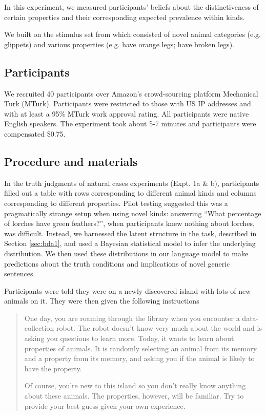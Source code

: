 \documentclass[10pt,letterpaper]{article}
\begin{document}
In this experiment, we measured participants' beliefs about the distinctiveness of certain properties and their corresponding expected prevalence within kinds.

We built on the stimulus set from  which consisted of novel animal categories (e.g. glippets) and various properties (e.g. have orange legs; have broken legs).


\subsection{Participants}

We recruited 40 participants over Amazon's crowd-sourcing platform Mechanical Turk (MTurk).  
Participants were restricted to those with US IP addresses and with at least a 95\% MTurk work approval rating. 
All participants were native English speakers. 
The experiment took about 5-7 minutes and participants were compensated \$0.75.

\subsection{Procedure and materials}

In the truth judgments of natural cases experiments (Expt. 1a \& b), participants filled out a table with rows corresponding to different animal kinds and columns corresponding to different properties. 
Pilot testing suggested this was a pragmatically strange setup when using novel kinds: answering ``What percentage of lorches have green feathers?'', when participants knew nothing about lorches, was difficult.
Instead, we harnessed the latent structure in the task, described in Section \ref{sec:bda1}, and used a Bayesian statistical model to infer the underlying distribution. 
We then used these distributions in our language model to make predictions about the truth conditions and implications of novel generic sentences.


Participants were told they were on a newly discovered island with lots of new animals on it. They were then given the following instructions

\begin{quote}
One day, you are roaming through the library when you encounter a data-collection robot. The robot doesn't know very much about the world and is asking you questions to learn more. Today, it wants to learn about properties of animals. It is randomly selecting an animal from its memory and a property from its memory, and asking you if the animal is likely to have the property.

Of course, you're new to this island so you don't really know anything about these animals. The properties, however, will be familiar. Try to provide your best guess given your own experience.
\end{quote}
\end{document}
